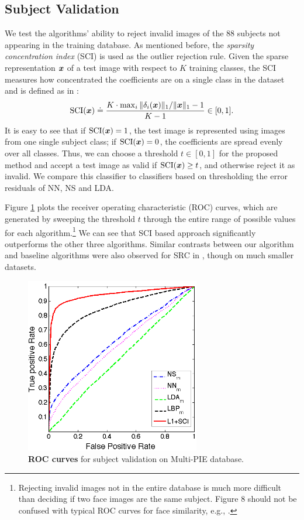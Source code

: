 \documentclass[12pt,journal,draftcls,letterpaper,onecolumn]{IEEEtran}
\begin{document}
\subsection{Subject Validation}

We test the algorithms' ability to reject invalid images of the
88 subjects not appearing in the training database. As
mentioned before, the \emph{sparsity concentration index} (SCI)
is used as the outlier rejection rule. Given the sparse
representation ${\boldsymbol{x}}$ of a test image with respect to $K$
training classes, the SCI measures how concentrated the
coefficients are on a single class in the dataset and is
defined as in \cite{Wright2009-PAMI}:
\begin{displaymath}
\textup{SCI}({\boldsymbol{x}}) \doteq \frac{K \cdot \max_i \|\delta_i({\boldsymbol{x}})\|_1 /
\|{\boldsymbol{x}}\|_1 - 1}{K - 1} \in [0,1] .
\end{displaymath}
It is easy to see that if $\textup{SCI}({\boldsymbol{x}}) = 1$, the test
image is represented using images from one single subject
class; if $\textup{SCI}({\boldsymbol{x}}) = 0$, the coefficients are spread
evenly over all classes. Thus, we can choose a threshold $t \in
[0,1]$ for the proposed method and accept a test image as valid
if $\textup{SCI}({\boldsymbol{x}}) \geq t$, and otherwise reject it as
invalid. We compare this classifier to classifiers based on
thresholding the error residuals of NN, NS and LDA.

Figure \ref{fig:roc-multipie} plots the receiver operating
characteristic (ROC) curves, which are generated by sweeping
the threshold $t$ through the entire range of possible values
for each algorithm.\footnote{Rejecting invalid images not in
the entire database is much more difficult than deciding if two
face images are the same subject. Figure 8 should not be
confused with typical ROC curves for face similarity, e.g.,
\cite{PhillipsP2007}.} We can see that SCI based approach
significantly outperforms the other three algorithms. Similar
contrasts between our algorithm and baseline algorithms were
also observed for SRC in \cite{Wright2009-PAMI}, though on much
smaller datasets.

\begin{figure}
\centerline{
\includegraphics[width=3in]{figures_pami/pami_roc2.png}
}
\caption{{\bf ROC curves} for subject validation on Multi-PIE database.}\label{fig:roc-multipie}
\end{figure}
\end{document}
